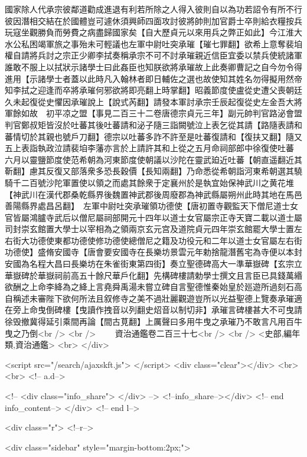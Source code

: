 國家除人代承宗彼鄰道勸成進退有利若所除之人得入彼則自以為功若詔令有所不行彼因潛相交結在於國體豈可遽休須興師四面攻討彼將帥則加官爵士卒則給衣糧按兵玩寇坐觀勝負而勞費之病盡歸國家矣【自大歷貞元以來用兵之弊正如此】今江淮大水公私困竭軍旅之事殆未可輕議也左軍中尉吐突承璀【璀七罪翻】欲希上意奪裴垍權自請將兵討之宗正少卿李拭奏稱承宗不可不討承璀親近信臣宜委以禁兵使統諸軍誰敢不服上以拭狀示諸學士曰此姦臣也知朕欲將承璀故上此奏卿曹記之自今勿令得進用【示諸學士者蓋以此時凡入翰林者即日輔佐之選也故使知其姓名勿得擬用然帝知李拭之迎逢而卒將承璀何邪欲將即亮翻上時掌翻】昭義節度使盧從史遭父喪朝廷久未起復從史懼因承璀說上【說式芮翻】請發本軍討承宗壬辰起復從史左金吾大將軍餘如故　初平凉之盟【事見二百三十二卷唐德宗貞元三年】副元帥判官路泌會盟判官鄭叔矩皆沒於吐蕃其後吐蕃請和泌子隨三詣闕號泣上表乞從其請【路隨表請和蕃情切於其親也號戶刀翻】德宗以吐蕃多詐不許至是吐蕃復請和【復扶又翻】隨又五上表詣執政泣請裴垍李藩亦言於上請許其和上從之五月命祠部郎中徐復使吐蕃　六月以靈鹽節度使范希朝為河東節度使朝議以沙陀在靈武廹近吐蕃【朝直遥翻近其靳翻】慮其反復又部落衆多恐長穀價【長知兩翻】乃命悉從希朝詣河東希朝選其驍騎千二百號沙陀軍置使以領之而處其餘衆于定襄州於是執宜始保神武川之黄花堆【神武川在漢代郡桑乾縣界後魏置神武郡後周廢郡為神武縣屬朔州此時其地在馬邑善陽縣界處昌呂翻】　左軍中尉吐突承璀領功德使【唐初置寺觀監天下僧尼道士女官皆屬鴻臚寺武后以僧尼屬祠部開元十四年以道士女官屬宗正寺天寶二載以道士屬司封崇玄館置大學士以宰相為之領兩京玄元宫及道院貞元四年崇玄館罷大學士置左右街大功德使東都功德使修功德使總僧尼之籍及功役元和二年以道士女官屬左右街功德使】盛脩安國寺【唐會要安國寺在長樂坊景雲元年勅捨龍潛舊宅為寺便以本封安國為名程大昌曰長樂坊在朱雀街東第四街】奏立聖德碑高大一準華嶽碑【玄宗立華嶽碑於華嶽祠前高五十餘尺華戶化翻】先構碑樓請勅學士撰文且言臣已具錢萬緡欲酬之上命李絳為之絳上言堯舜禹湯未嘗立碑自言聖德惟秦始皇於廵遊所過刻石高自稱述未審陛下欲何所法且叙修寺之美不過壯麗觀遊豈所以光益聖德上覽奏承璀適在旁上命曳倒碑樓【曳讀作拽音以列翻史炤音以制切非】承璀言碑樓甚大不可曳請徐毁撤冀得延引乘間再論【間古莧翻】上厲聲曰多用牛曳之承璀乃不敢言凡用百牛曳之乃倒<br />
<br />
　　資治通鑑卷二百三十七<br />
<br />
<史部,編年類,資治通鑑>  <br>
   </div> 

<script src="/search/ajaxskft.js"> </script>
 <div class="clear"></div>
<br>
<br>
 <!-- a.d-->

 <!--
<div class="info_share">
</div> 
-->
 <!--info_share--></div>   <!-- end info_content-->
  </div> <!-- end l-->

<div class="r">   <!--r-->



<div class="sidebar"  style="margin-bottom:2px;">

